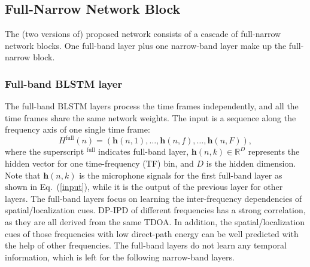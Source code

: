 \documentclass[lettersize,journal]{IEEEtran}
\begin{document}

\subsection{Full-Narrow Network Block}
The (two versions of) proposed network consists of a cascade of full-narrow network blocks. One full-band layer plus one narrow-band layer make up the full-narrow block.  
\subsubsection{Full-band BLSTM layer}

The full-band BLSTM layers process the time frames independently, and all the time frames share the same network weights. The input is a sequence along the frequency axis of one single time frame: 
\begin{equation}
    H^{\text{full}}(n) = (\mathbf{h}(n,1), \dots,\mathbf{h}(n,f), \dots , \mathbf{h}(n,F)),
\end{equation}
where the superscript $^{\text{full}}$ indicates full-band layer, $\mathbf{h}(n,k)\in \mathbb{R}^{D}$ represents the hidden vector for one time-frequency (TF) bin, and $D$ is the hidden dimension. Note that $\mathbf{h}(n,k)$ is the microphone signals for the first full-band layer as shown in Eq.~(\ref{input}), while it is the output of the previous layer for other layers. The full-band layers focus on learning the inter-frequency dependencies of spatial/localization cues. DP-IPD of different frequencies has a strong correlation, as they are all derived from the same TDOA. In addition, the spatial/localization cues of those frequencies with low direct-path energy can be well predicted with the help of other frequencies. The full-band layers do not learn any temporal information, which is left for the following narrow-band layers. 
\end{document}
